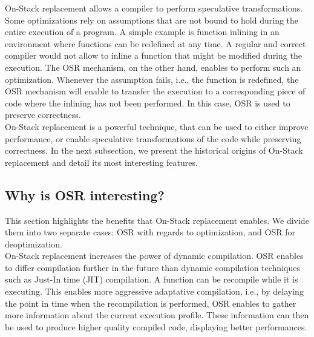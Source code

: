 On-Stack replacement allows a compiler to perform speculative transformations.
Some optimizations rely on assumptions that are not bound to hold during the entire execution of a program.
A simple example is function inlining in an environment where functions can be redefined at any time.
A regular and correct compiler would not allow to inline a function that might be modified during the execution.
The OSR mechanism, on the other hand, enables to perform such an optimization.
Whenever the assumption fails, i.e., the function is redefined, the OSR mechanism will enable to transfer the execution to a corresponding piece of code where the inlining has not been performed.
In this case, OSR is used to preserve correctness.\\

On-Stack replacement is a powerful technique, that can be used to either improve performance, or enable speculative transformations of the code while preserving correctness.
In the next subsection, we present the historical origins of On-Stack replacement and detail its most interesting features.\\ %

\subsection{Why is OSR interesting?}
    
This section highlights the benefits that On-Stack replacement enables.
We divide them into two separate cases: OSR with regards to optimization, and OSR for deoptimization.\\

On-Stack replacement increases the power of dynamic compilation.
OSR enables to differ compilation further in the future than dynamic compilation techniques such as Just-In time (JIT) compilation.
A function can be recompile while it is executing.
This enables more aggressive adaptative compilation, i.e., by delaying the point in time when the recompilation is performed, OSR enables to gather more information about the current execution profile. These information can then be used to produce higher quality compiled code, displaying better performances.

